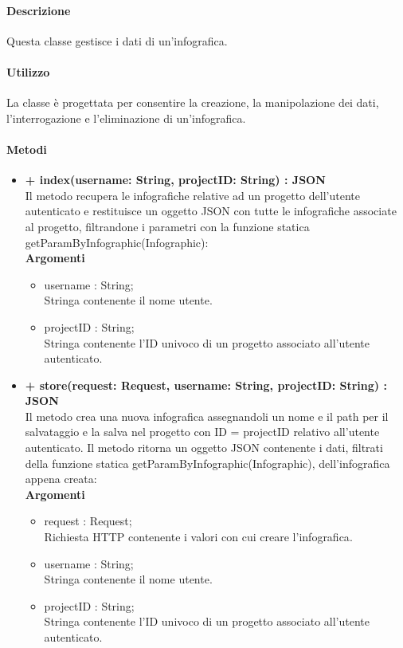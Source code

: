 	\paragraph{Descrizione}
		Questa classe gestisce i dati di un'\gls{infografica}.
	\paragraph{Utilizzo}
		La classe è progettata per consentire la creazione, la manipolazione dei dati, l'interrogazione e l'eliminazione di un'\gls{infografica}.
		
	\paragraph{Metodi}
		\begin{itemize}
			\item \textbf{+ index(username: String, projectID: String) : JSON}\\
			Il metodo recupera le infografiche relative ad un progetto dell'utente autenticato e restituisce un oggetto \gls{JSON} con tutte le infografiche associate al progetto, filtrandone i parametri con la funzione statica getParamByInfographic(Infographic):\\
			\textbf{Argomenti}
			\begin{itemize}
				\item username : String; \\
				Stringa contenente il nome utente.
				\item projectID : String; \\
				Stringa contenente l'ID univoco di un progetto associato all'utente autenticato.
			\end{itemize}
			
			\item \textbf{+ store(request: Request, username: String, projectID: String) : JSON}\\
			Il metodo crea una nuova \gls{infografica} assegnandoli un nome e il path per il salvataggio e la salva nel progetto con ID = projectID relativo all'utente autenticato. Il metodo ritorna un oggetto \gls{JSON} contenente i dati, filtrati della funzione statica getParamByInfographic(Infographic), dell'\gls{infografica} appena creata:\\
			\textbf{Argomenti}
			\begin{itemize}
				\item request : Request;\\
				Richiesta HTTP contenente i valori con cui creare l'\gls{infografica}.
				\item username : String; \\
				Stringa contenente il nome utente.
				\item projectID : String; \\
				Stringa contenente l'ID univoco di un progetto associato all'utente autenticato.
			\end{itemize}
			

\end{itemize}
